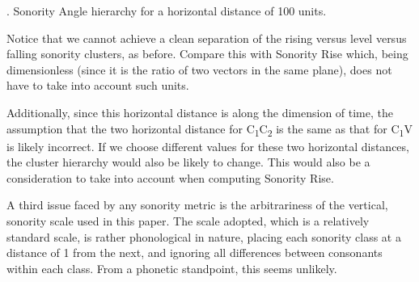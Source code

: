 \documentclass[12pt]{article}
\begin{document}
\ex. {\sc Sonority Angle} hierarchy for a horizontal distance of 100 units.


Notice that we cannot achieve a clean separation of the rising versus level versus falling sonority clusters, as before. Compare this with {\sc Sonority Rise} which, being dimensionless (since it is the ratio of two vectors in the same plane), does not have to take into account such units.

Additionally, since this horizontal distance is along the dimension of time, the assumption that the two horizontal distance for C\textsubscript{1}C\textsubscript{2} is the same as that for C\textsubscript{1}V is likely incorrect. If we choose different values for these two horizontal distances, the cluster hierarchy would also be likely to change. This would also be a consideration to take into account when computing {\sc Sonority Rise}.

\bigskip

 A third issue faced by any sonority metric is the arbitrariness of the vertical, sonority scale used in this paper. The scale adopted, which is a relatively standard scale, is rather phonological in nature, placing each sonority class at a distance of 1 from the next, and ignoring all differences between consonants within each class. From a phonetic standpoint, this seems unlikely.
\end{document}
